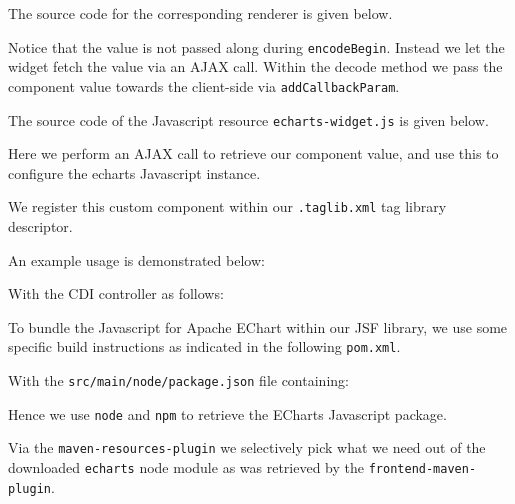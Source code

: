 The source code for the corresponding renderer is given below.

Notice that the value is not passed along during \texttt{encodeBegin}.
Instead we let the widget fetch the value via an AJAX call.
Within the decode method we pass the component value towards the client-side via \texttt{addCallbackParam}.

The source code of the Javascript resource \texttt{echarts-widget.js} is given below.

Here we perform an AJAX call to retrieve our component value, and use this to configure the echarts Javascript instance.

We register this custom component within our \texttt{.taglib.xml} tag library descriptor.


An example usage is demonstrated below:


With the CDI controller as follows:


To bundle the Javascript for Apache EChart within our JSF library, we use some specific build instructions as indicated in the following \texttt{pom.xml}.

With the \texttt{src/main/node/package.json} file containing:

Hence we use \texttt{node} and \texttt{npm} to retrieve the ECharts Javascript package.

Via the \texttt{maven-resources-plugin} we selectively pick what we need out of the downloaded \texttt{echarts} node module as was retrieved by the \texttt{frontend-maven-plugin}.